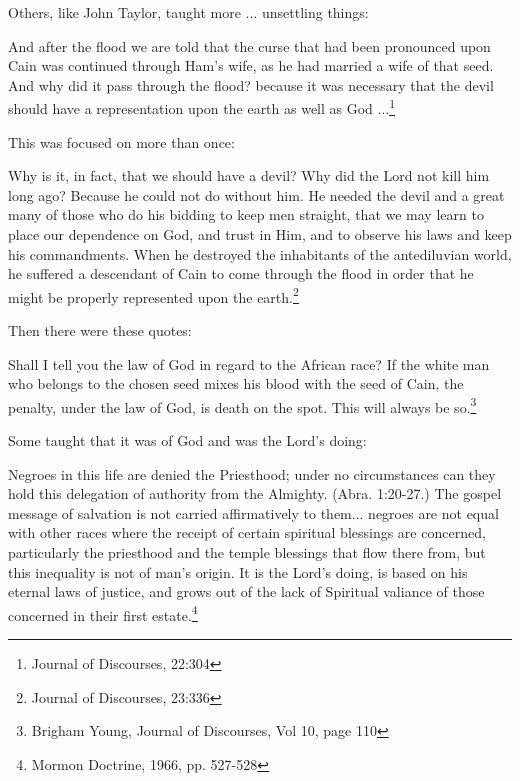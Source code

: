 \documentclass{article}
\begin{document}
Others, like John Taylor, taught more ... unsettling things:

\begin{displayquote}
And after the flood we are told that the curse that had been pronounced upon 
Cain was continued through Ham's wife, as he had married a wife of that seed. 
And why did it pass through the flood? because it was necessary that the devil 
should have a representation upon the earth as well as 
God ...\footnote{Journal of Discourses, 22:304}
\end{displayquote}

This was focused on more than once:

\begin{displayquote}
Why is it, in fact, that we should have a devil? Why did the Lord not kill 
him long ago? Because he could not do without him. He needed the devil and a 
great many of those who do his bidding to keep men straight, that we may learn 
to place our dependence on God, and trust in Him, and to observe his laws and 
keep his commandments. When he destroyed the inhabitants of the antediluvian 
world, he suffered a descendant of Cain to come through the flood in order 
that he might be properly represented upon the 
earth.\footnote{Journal of Discourses, 23:336}
\end{displayquote}

Then there were these quotes:

\begin{displayquote}
Shall I tell you the law of God in regard to the African race? If the white 
man who belongs to the chosen seed mixes his blood with the seed of Cain, 
the penalty, under the law of God, is death on the spot. This will 
always be so.\footnote{Brigham Young, Journal of Discourses, Vol 10, page 110}
\end{displayquote}

Some taught that it was of God and was the Lord's doing:

\begin{displayquote}
Negroes in this life are denied the Priesthood; under no circumstances can 
they hold this delegation of authority from the Almighty. (Abra. 1:20-27.) 
The gospel message of salvation is not carried affirmatively to them... 
negroes are not equal with other races where the receipt of certain 
spiritual blessings are concerned, particularly the priesthood and 
the temple blessings that flow there from, but this inequality is 
not of man's origin. It is the Lord's doing, is based on his eternal 
laws of justice, and grows out of the lack of Spiritual valiance of those 
concerned in their first estate.\footnote{Mormon Doctrine, 1966, pp. 527-528}
\end{displayquote}
\end{document}
